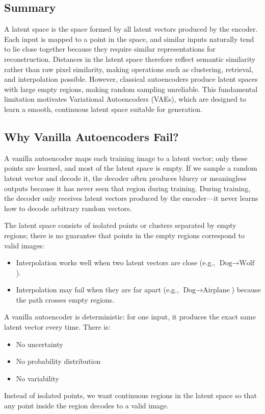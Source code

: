 \subsection*{Summary}
A latent space is the space formed by all latent vectors produced by the encoder. Each input is mapped to a point in the space, and similar inputs naturally tend to lie close together because they require similar representations for reconstruction. Distances in the latent space therefore reflect semantic similarity rather than raw pixel similarity, making operations such as clustering, retrieval, and interpolation possible. However, classical autoencoders produce latent spaces with large empty regions, making random sampling unreliable. This fundamental limitation motivates Variational Autoencoders (VAEs), which are designed to learn a smooth, continuous latent space suitable for generation.

\subsection*{Why Vanilla Autoencoders Fail?}
A vanilla autoencoder maps each training image to a latent vector; only these points are learned, and most of the latent space is empty. If we sample a random latent vector and decode it, the decoder often produces blurry or meaningless outputs because it has never seen that region during training. During training, the decoder only receives latent vectors produced by the encoder—it never learns how to decode arbitrary random vectors.

The latent space consists of isolated points or clusters separated by empty regions; there is no guarantee that points in the empty regions correspond to valid images:
\begin{itemize}
    \item Interpolation works well when two latent vectors are close (e.g., $\text{Dog} \rightarrow \text{Wolf}$).
    \item Interpolation may fail when they are far apart (e.g., $\text{Dog} \rightarrow \text{Airplane}$) because the path crosses empty regions.
\end{itemize}

A vanilla autoencoder is deterministic: for one input, it produces the exact same latent vector every time. There is:
\begin{itemize}
    \item No uncertainty
    \item No probability distribution
    \item No variability
\end{itemize}
Instead of isolated points, we want continuous regions in the latent space so that any point inside the region decodes to a valid image.

